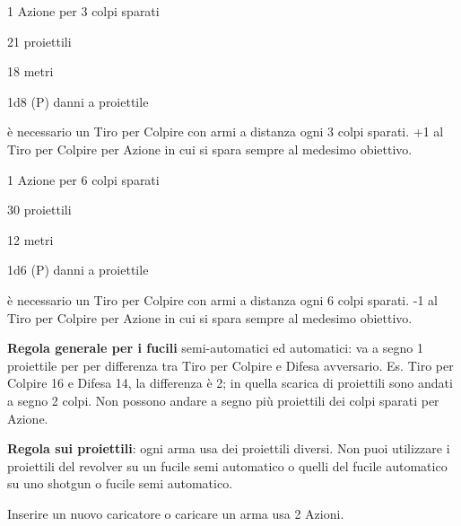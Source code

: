 \begin{multicols}{2}
\begin{description}[noitemsep, topsep=0pt, parsep=0pt, partopsep=0pt, leftmargin=0cm, labelwidth=2cm]
	\item[\textbf{Fucile Semi-automatico}]
	\item[\textbf{Azioni:}] 1 Azione per 3 colpi sparati
	\item[\textbf{Caricatore:}] 21 proiettili
	\item[\textbf{Gittata:}] 18 metri
	\item[\textbf{Danno:}] 1d8 (P) danni a proiettile
	\item[\textbf{Regole:}] è necessario un Tiro per Colpire con armi a distanza ogni 3 colpi sparati. +1 al Tiro per Colpire per Azione in cui si spara sempre al medesimo obiettivo.
\end{description}

\medskip

\begin{description}[noitemsep, topsep=0pt, parsep=0pt, partopsep=0pt, leftmargin=0cm, labelwidth=2cm]
	\item[\textbf{Fucile Automatico}]
	\item[\textbf{Azioni:}] 1 Azione per 6 colpi sparati
	\item[\textbf{Caricatore:}] 30 proiettili
	\item[\textbf{Gittata:}] 12 metri
	\item[\textbf{Danno:}] 1d6 (P) danni a proiettile
	\item[\textbf{Regole:}] è necessario un Tiro per Colpire con armi a distanza ogni 6 colpi sparati. -1 al Tiro per Colpire per Azione in cui si spara sempre al medesimo obiettivo.
\end{description}

\medskip

\textbf{Regola generale per i fucili} semi-automatici ed automatici: va a segno 1 proiettile per per differenza tra Tiro per Colpire e Difesa avversario. Es. Tiro per Colpire 16 e Difesa 14, la differenza è 2; in quella scarica di proiettili sono andati a segno 2 colpi. Non possono andare a segno più proiettili dei colpi sparati per Azione.

\textbf{Regola sui proiettili}: ogni arma usa dei proiettili diversi. Non puoi utilizzare i proiettili del revolver su un fucile semi automatico o quelli del fucile automatico su uno shotgun o fucile semi automatico.

 Inserire un nuovo caricatore o caricare un arma usa 2 Azioni.


\end{multicols}

